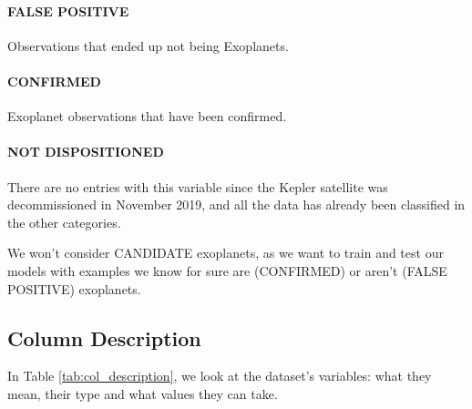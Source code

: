     \paragraph{FALSE POSITIVE} Observations that ended up not being Exoplanets.
    
    \paragraph{CONFIRMED} Exoplanet observations that have been confirmed.
    
    \paragraph{NOT DISPOSITIONED} There are no entries with this variable since the Kepler satellite was decommissioned
    in November 2019, and all the data has already been classified in the other categories.
    
We won't  consider CANDIDATE exoplanets, as we want to train and test our models
with examples we know for sure are (CONFIRMED) or aren't (FALSE POSITIVE) 
exoplanets.

\subsection{Column Description}

In Table \ref{tab:col_description}, we look at the dataset's variables: what
they mean, their type and what values they can take.

\newcommand{\dd}{\textsuperscript{\ddag}}

